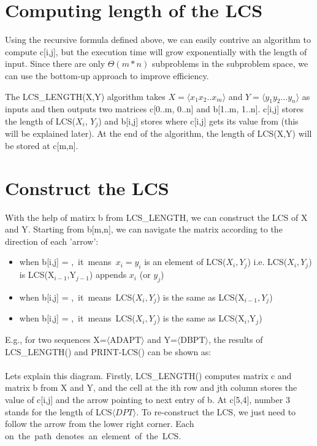 \documentclass{report}
\begin{document}
    \section{Computing length of the LCS}
    Using the recursive formula defined above, we can easily contrive an algorithm to compute c[i,j], but the execution time will grow exponentially with the length of input. Since there are only $\Theta(m*n)$ subproblems in the subproblem space, we can use the bottom-up approach to improve efficiency.
    
    \bigskip
    The LCS\_LENGTH(X,Y) algorithm takes $X=\langle x_1x_2..x_m\rangle$ and $Y = \langle y_1y_2...y_n\rangle$ as inputs and then outputs two matrices c[0..m, 0..n] and b[1..m, 1..n]. c[i,j] stores the length of LCS($X_i$, $Y_j$) and b[i,j] stores where c[i,j] gets its value from (this will be explained later). At the end of the algorithm, the length of LCS(X,Y) will be stored at c[m,n].
    
    
    \newpage
    \section{Construct the LCS}
    With the help of matirx b from LCS\_LENGTH, we can construct the LCS of X and Y. Starting from b[m,n], we can navigate the matrix according to the direction of each 'arrow':
    \begin{itemize}
        \item when b[i,j] = \nwarrow,~it~means~$x_i=y_i$ is an element of LCS($X_i,Y_j$) i.e. LCS($X_i,Y_j$) is LCS(X$_{i-1}$,Y$_{j-1}$) appends $x_i$ (or $y_j$)
        \item when b[i,j] = \uparrow,~it~means~LCS($X_i,Y_j$) is the same as LCS(X$_{i-1},Y_j$)
        \item when b[i,j] = \leftarrow,~it~means~LCS($X_i,Y_j$) is the same as LCS(X$_i$,Y$_j$)
    \end{itemize}
    
    \newpage
    E.g., for two sequences X=$\langle$ADAPT$\rangle$ and Y=$\langle$DBPT$\rangle$, the results of LCS\_LENGTH() and PRINT-LCS() can be shown as:\\\\
    
    \bigskip
    Lets explain this diagram. Firstly, LCS\_LENGTH() computes matrix c and matrix b from X and Y, and the cell at the ith row and jth column stores the value of c[i,j] and the arrow pointing to next entry of b. At c[5,4], number 3 stands for the length of LCS$\langle DPT \rangle$. To re-construct the LCS, we just need to follow the arrow from the lower right corner. Each \nwarrow on~the~path~denotes~an~element~of~the~LCS.
    
\end{document}
